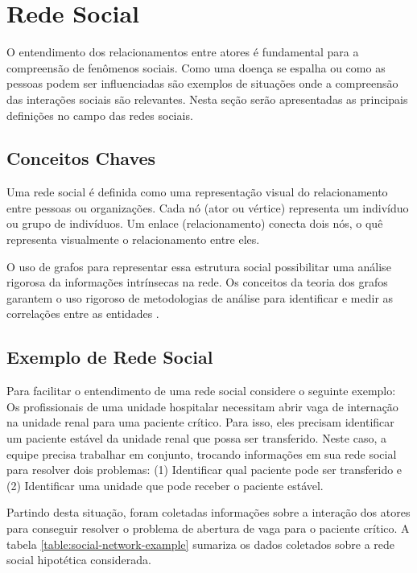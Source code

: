 \section{Rede Social}
O entendimento dos relacionamentos entre atores é fundamental para a compreensão de fenômenos sociais. Como uma doença se espalha ou como as pessoas podem ser influenciadas são exemplos de situações onde a compreensão das interações sociais são relevantes. Nesta seção serão apresentadas as principais definições no campo das redes sociais.

\subsection{Conceitos Chaves}
Uma rede social é definida como uma representação visual do relacionamento entre pessoas ou organizações. Cada nó (ator ou vértice) representa um indivíduo ou grupo de indivíduos. Um enlace (relacionamento) conecta dois nós, o quê representa visualmente o relacionamento entre eles.

O uso de grafos para representar essa estrutura social possibilitar uma análise rigorosa da informações intrínsecas na rede. Os conceitos da teoria dos grafos garantem o uso rigoroso de metodologias de análise para identificar e medir as correlações entre as entidades \cite{pan2007effective}.

\subsection{Exemplo de Rede Social}
Para facilitar o entendimento de uma rede social considere o seguinte exemplo: Os profissionais de uma unidade hospitalar necessitam abrir vaga de internação na unidade renal para uma paciente crítico. Para isso, eles precisam identificar um paciente estável da unidade renal que possa ser transferido. Neste caso, a equipe precisa trabalhar em conjunto, trocando informações em sua rede social para resolver dois problemas: (1) Identificar qual paciente pode ser transferido e (2) Identificar uma unidade que pode receber o paciente estável.

Partindo desta situação, foram coletadas informações sobre a interação dos atores para conseguir resolver o problema de abertura de vaga para o paciente crítico. A tabela \ref{table:social-network-example} sumariza os dados coletados sobre a rede social hipotética considerada. 


